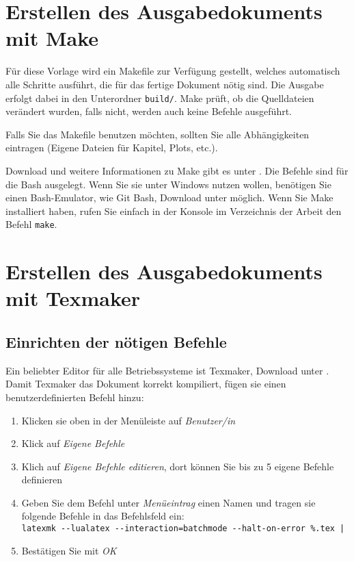\section{Erstellen des Ausgabedokuments mit Make}

Für diese Vorlage wird ein Makefile zur Verfügung gestellt, welches automatisch alle Schritte ausführt, die für das fertige Dokument nötig sind.
Die Ausgabe erfolgt dabei in den Unterordner \texttt{build/}.
Make prüft, ob die Quelldateien verändert wurden, falls nicht, werden auch keine Befehle ausgeführt.

Falls Sie das Makefile benutzen möchten, sollten Sie alle Abhängigkeiten eintragen (Eigene Dateien für Kapitel, Plots, etc.).


Download und weitere Informationen zu Make gibt es unter \cite{make}. Die Befehle sind für die Bash ausgelegt.
Wenn Sie sie unter Windows nutzen wollen, benötigen Sie einen Bash-Emulator, wie Git Bash, Download unter \cite{gitbash} möglich.
Wenn Sie Make installiert haben, rufen Sie einfach in der Konsole im Verzeichnis der Arbeit den Befehl \texttt{make}.

\section{Erstellen des Ausgabedokuments mit Texmaker}
\subsection{Einrichten der nötigen Befehle}
Ein beliebter Editor für alle Betriebssysteme ist Texmaker, Download unter \cite{texmaker}.
Damit Texmaker das Dokument korrekt kompiliert, fügen sie einen benutzerdefinierten Befehl hinzu:
\begin{enumerate}[nosep]
    \item Klicken sie oben in der Menüleiste auf \emph{Benutzer/in}
    \item Klick auf \emph{Eigene Befehle}
    \item Klich auf \emph{Eigene Befehle editieren}, dort können Sie bis zu 5 eigene Befehle definieren
    \item Geben Sie dem Befehl unter \emph{Menüeintrag} einen Namen und tragen sie folgende Befehle in das Befehlsfeld ein: \\
      \verb+latexmk --lualatex --interaction=batchmode --halt-on-error %.tex |+ \\
    \item Bestätigen Sie mit \emph{OK}
\end{enumerate}

